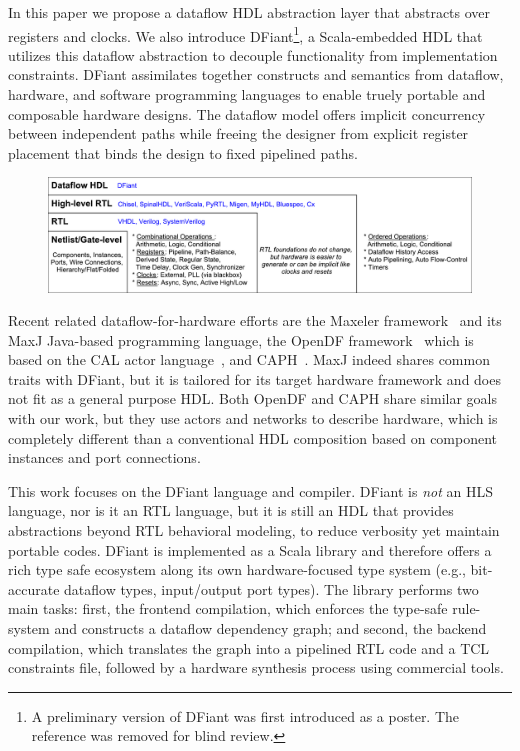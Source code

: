 In this paper we propose a dataflow HDL abstraction layer that abstracts over registers and clocks. We also introduce DFiant\footnote{A preliminary version of DFiant was first introduced as a poster. The reference was removed for blind review.}, a Scala-embedded HDL that utilizes this dataflow abstraction to decouple functionality from implementation constraints. DFiant assimilates together constructs and semantics from dataflow\cite{le1986signal, Thuau1991}, hardware, and software programming languages to enable truely portable and composable hardware designs. The dataflow model offers implicit concurrency between independent paths while freeing the designer from explicit register placement that binds the design to fixed pipelined paths.  

\begin{figure}[t]
	\centering
	\captionsetup{justification=centering}
	\includegraphics[width=\linewidth]{graphics/motivation.pdf} 
	\label{fig:motivation}
\end{figure}

Recent related dataflow-for-hardware efforts are the Maxeler framework~\cite{Pell2011} and its MaxJ Java-based programming language, the OpenDF framework~\cite{bhattacharyya2008opendf} which is based on the CAL actor language~\cite{eker2003cal}, and CAPH~\cite{serot2011implementing}. MaxJ indeed shares common traits with DFiant, but it is tailored for its target hardware framework and does not fit as a general purpose HDL. Both OpenDF and CAPH share similar goals with our work, but they use actors and networks to describe hardware, which is completely different than a conventional HDL composition based on component instances and port connections.

This work focuses on the DFiant language and compiler. DFiant is \emph{not} an HLS language, nor is it an RTL language, but it is still an HDL that provides abstractions beyond RTL behavioral modeling, to reduce verbosity yet maintain portable codes.
DFiant is implemented as a Scala library and therefore offers a rich type safe ecosystem along its own hardware-focused type system (e.g., bit-accurate dataflow types, input/output port types). The library performs two main tasks: first, the frontend compilation, which enforces the type-safe rule-system and constructs a dataflow dependency graph; and second, the backend compilation, which translates the graph into a pipelined RTL code and a TCL constraints file, followed by a hardware synthesis process using commercial tools. 

